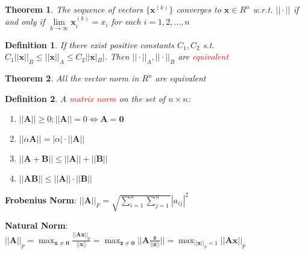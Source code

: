 \documentclass[11pt]{article}
\newtheorem{theorem}{Theorem}[section]
\newtheorem{definition}{Definition}[section]
\begin{document}
\begin{theorem}
The sequence of vectors $\{\mathbf{x}^{(k)}\}$ converges to $ \mathbf{x}\in R^n$
w.r.t. $||\cdot||$ if and only if $ \lim\limits_{k\to\infty}\mathbf{x}^{(k)}_i=x_i$
for each $i=1,2,\dots,n$
\end{theorem}

\begin{definition}
If there exist positive constants $C_1,C_2$ s.t. $C_1||\mathbf{x}||_B\le||\mathbf{x}||_A
\le C_2||\mathbf{x}|_B|$. Then $||\cdot||_A,||\cdot||_B$ are \textcolor{red}{equivalent} 
\end{definition}

\begin{theorem}
All the vector norm in $R^n$ are equivalent
\end{theorem}


\begin{definition}
  A \textcolor{red}{matrix norm} on the set of $n\times n$:
\begin{enumerate}
\item $||\mathbf{A}||\ge0;||\mathbf{A}||=0\Longleftrightarrow \mathbf{A}=\mathbf{0}$
\item $||\alpha \mathbf{A}||=|\alpha|\cdot||\mathbf{A}||$
\item $||\mathbf{A}+\mathbf{B}||\le||\mathbf{A}||+||\mathbf{B}||$
\item $||\mathbf{AB}||\le||\mathbf{A}||\cdot||\mathbf{B}||$
\end{enumerate}
\end{definition}

\textbf{Frobenius Norm}: \(||\mathbf{A}||_F=\sqrt{\displaystyle\sum_{i=1}^n
   \displaystyle\sum_{j=1}^n}|a_{ij}|^2\)

\textbf{Natural Norm}: \(||\mathbf{A}||_p=\displaystyle\max_{\mathbf{x}\neq
   \mathbf{0}}\frac{||\mathbf{Ax}||_p}{||\mathbf{x}||}=\displaystyle\max_{\mathbf{z}\neq
   \mathbf{0}}||\mathbf{A}\frac{\mathbf{z}}{||\mathbf{z}||}||=\displaystyle\max_{||\mathbf{x}||_p=1}||\mathbf{Ax}||_p\)
\end{document}
